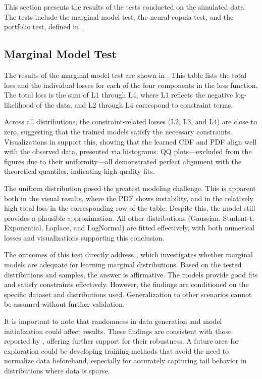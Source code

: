 
This section presents the results of the tests conducted on the simulated data. The tests include the marginal model test, the neural copula test, and the portfolio test, defined in .

\subsection{Marginal Model Test}
The results of the marginal model test are shown in . This table lists the total loss and the individual losses for each of the four components in the loss function. The total loss is the sum of L1 through L4, where L1 reflects the negative log-likelihood of the data, and L2 through L4 correspond to constraint terms.

Across all distributions, the constraint-related losses (L2, L3, and L4) are close to zero, suggesting that the trained models satisfy the necessary constraints. Visualizations in  support this, showing that the learned CDF and PDF align well with the observed data, presented via histograms. QQ plots—excluded from the figures due to their uniformity—all demonstrated perfect alignment with the theoretical quantiles, indicating high-quality fits.

The uniform distribution posed the greatest modeling challenge. This is apparent both in the visual results, where the PDF shows instability, and in the relatively high total loss in the corresponding row of the table. Despite this, the model still provides a plausible approximation. All other distributions (Gaussian, Student-t, Exponential, Laplace, and LogNormal) are fitted effectively, with both numerical losses and visualizations supporting this conclusion.

The outcomes of this test directly address \RQone, which investigates whether marginal models are adequate for learning marginal distributions. Based on the tested distributions and samples, the answer is affirmative. The models provide good fits and satisfy constraints effectively. However, the findings are conditioned on the specific dataset and distributions used. Generalization to other scenarios cannot be assumed without further validation.

It is important to note that randomness in data generation and model initialization could affect results. These findings are consistent with those reported by \citet[p.~14]{ZengWang2022}, offering further support for their robustness. A future area for exploration could be developing training methods that avoid the need to normalize data beforehand, especially for accurately capturing tail behavior in distributions where data is sparse.

